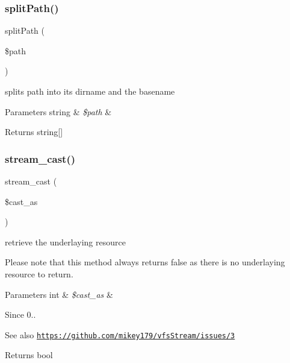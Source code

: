 \subsubsection{\texorpdfstring{split\+Path()}{splitPath()}}
{\footnotesize\ttfamily split\+Path (\begin{DoxyParamCaption}\item[{}]{\$path }\end{DoxyParamCaption})\hspace{0.3cm}{\ttfamily [protected]}}

splits path into its dirname and the basename


\begin{DoxyParams}[1]{Parameters}
string & {\em \$path} & \\
\hline
\end{DoxyParams}
\begin{DoxyReturn}{Returns}
string\mbox{[}\mbox{]} 
\end{DoxyReturn}
\mbox{\label{classorg_1_1bovigo_1_1vfs_1_1vfs_stream_wrapper_afd8c7ec563b853761ea7d3470d0bee73}} 
\subsubsection{\texorpdfstring{stream\+\_\+cast()}{stream\_cast()}}
{\footnotesize\ttfamily stream\+\_\+cast (\begin{DoxyParamCaption}\item[{}]{\$cast\+\_\+as }\end{DoxyParamCaption})}

retrieve the underlaying resource

Please note that this method always returns false as there is no underlaying resource to return.


\begin{DoxyParams}[1]{Parameters}
int & {\em \$cast\+\_\+as} & \\
\hline
\end{DoxyParams}
\begin{DoxySince}{Since}
0.. 
\end{DoxySince}
\begin{DoxySeeAlso}{See also}
\href{https://github.com/mikey179/vfsStream/issues/3}{\tt https\+://github.\+com/mikey179/vfs\+Stream/issues/3} 
\end{DoxySeeAlso}
\begin{DoxyReturn}{Returns}
bool 
\end{DoxyReturn}
\mbox{\label{classorg_1_1bovigo_1_1vfs_1_1vfs_stream_wrapper_af4c22f18f65f3a87da0abd141752a3f4}} 
